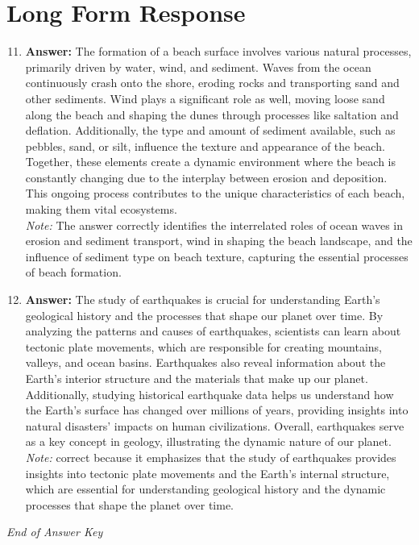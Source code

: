 \documentclass[12pt]{article}
\begin{document}
\section*{Long Form Response}
\begin{enumerate}[label=\arabic*.]
\setcounter{enumi}{10}
\item \textbf{Answer:} The formation of a beach surface involves various natural processes, primarily driven by water, wind, and sediment. Waves from the ocean continuously crash onto the shore, eroding rocks and transporting sand and other sediments. Wind plays a significant role as well, moving loose sand along the beach and shaping the dunes through processes like saltation and deflation. Additionally, the type and amount of sediment available, such as pebbles, sand, or silt, influence the texture and appearance of the beach. Together, these elements create a dynamic environment where the beach is constantly changing due to the interplay between erosion and deposition. This ongoing process contributes to the unique characteristics of each beach, making them vital ecosystems.
\\ \textit{Note:} The answer correctly identifies the interrelated roles of ocean waves in erosion and sediment transport, wind in shaping the beach landscape, and the influence of sediment type on beach texture, capturing the essential processes of beach formation.
\item \textbf{Answer:} The study of earthquakes is crucial for understanding Earth's geological history and the processes that shape our planet over time. By analyzing the patterns and causes of earthquakes, scientists can learn about tectonic plate movements, which are responsible for creating mountains, valleys, and ocean basins. Earthquakes also reveal information about the Earth's interior structure and the materials that make up our planet. Additionally, studying historical earthquake data helps us understand how the Earth's surface has changed over millions of years, providing insights into natural disasters' impacts on human civilizations. Overall, earthquakes serve as a key concept in geology, illustrating the dynamic nature of our planet.
\\ \textit{Note:} correct because it emphasizes that the study of earthquakes provides insights into tectonic plate movements and the Earth's internal structure, which are essential for understanding geological history and the dynamic processes that shape the planet over time.
\end{enumerate}

\vfill
\noindent\textit{End of Answer Key}
\end{document}
